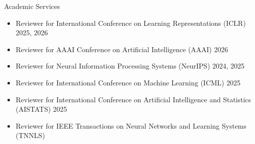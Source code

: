 \documentclass{resume} %
\begin{document}





\begin{rSection}{Academic Services}

 \begin{itemize}[leftmargin=1.5em, itemsep=2pt, parsep=0pt, topsep=3pt]
    \item Reviewer for International Conference on Learning Representations (ICLR) 2025, 2026
    \item Reviewer for AAAI Conference on Artificial Intelligence (AAAI) 2026
    \item Reviewer for Neural Information Processing Systems (NeurIPS) 2024, 2025
    \item Reviewer for International Conference on Machine Learning (ICML) 2025
    \item Reviewer for International Conference on Artificial Intelligence and Statistics (AISTATS) 2025
    \item Reviewer for IEEE Transactions on Neural Networks and Learning Systems (TNNLS)
 \end{itemize}

\end{rSection}
\end{document}
